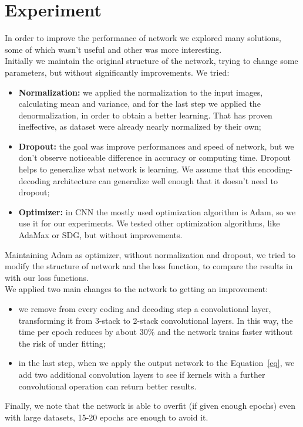 \documentclass[11pt, a4paper]{article}
\begin{document}
	\section{Experiment}
	In order to improve the performance of network we explored many solutions, some of which wasn't useful and other was more interesting.\\
	Initially we maintain the original structure of the network, trying to change some parameters, but without significantly improvements. We tried:
	\begin{itemize}
		\item \textbf{Normalization:} we applied the normalization to the input images, calculating mean and variance, and for the last step we applied the denormalization, in order to obtain a better learning. That has proven ineffective, as dataset were already nearly normalized by their own;
		\item \textbf{Dropout:} the goal was improve performances and speed of network, but we don't observe noticeable difference in accuracy or computing time. Dropout helps to generalize what network is learning. We assume that this encoding-decoding architecture can generalize well enough that it doesn't need to dropout; 
		\item \textbf{Optimizer:} in CNN the mostly used optimization algorithm is Adam, so we use it for our experiments. We tested other optimization algorithms, like AdaMax or SDG, but without improvements.
	\end{itemize}
	Maintaining Adam as optimizer, without normalization and dropout, we tried to modify the structure of network and the loss function, to compare the results in \cite{mainpaper} with our loss functions.\\
	We applied two main changes to the network to getting an improvement:
	\begin{itemize}
		\item we remove from every coding and decoding step a convolutional layer, transforming it from 3-stack to 2-stack convolutional layers. In this way, the time per epoch reduces by about 30\% and the network trains faster without the risk of under fitting;
		\item in the last step, when we apply the output network to the Equation~\ref{eq}, we add two additional convolution layers to see if kernels with a further convolutional operation can return better results. 
	\end{itemize}
	Finally, we note that the network is able to overfit (if given enough epochs) even with large datasets, 15-20 epochs are enough to avoid it.
	
\end{document}
